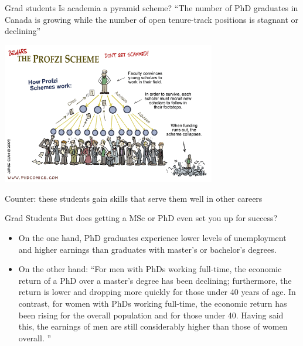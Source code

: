 \documentclass{beamer}
\begin{document}
\begin{frame}{Grad students}
	Is academia a pyramid scheme? ``The number of PhD graduates in Canada is growing while the
	number of open tenure-track positions is stagnant or declining''

	\begin{flushright}
		\includegraphics[width=0.7\textwidth]{../images/pyramidscheme}		
	\end{flushright}


Counter: these students gain skills that serve them well in other careers
\end{frame}

\begin{frame}{Grad Students}
	But does getting a MSc or PhD even set you up for success?
	
	\begin{itemize}
		\item<2-> On the one hand, PhD graduates experience lower levels of unemployment
		and higher earnings than graduates with master's or bachelor's degrees. 
		\item<3-> On the other hand: ``For men with PhDs working full-time, the economic return of a PhD over a
		master's degree has been declining; furthermore, the return is lower and
		dropping more quickly for those under 40 years of age. In contrast, for women
		with PhDs working full-time, the economic return has been rising for the overall
		population and for those under 40. Having said this, the earnings of men are still
		considerably higher than those of women overall. ''
	\end{itemize}

\end{frame}
\end{document}
